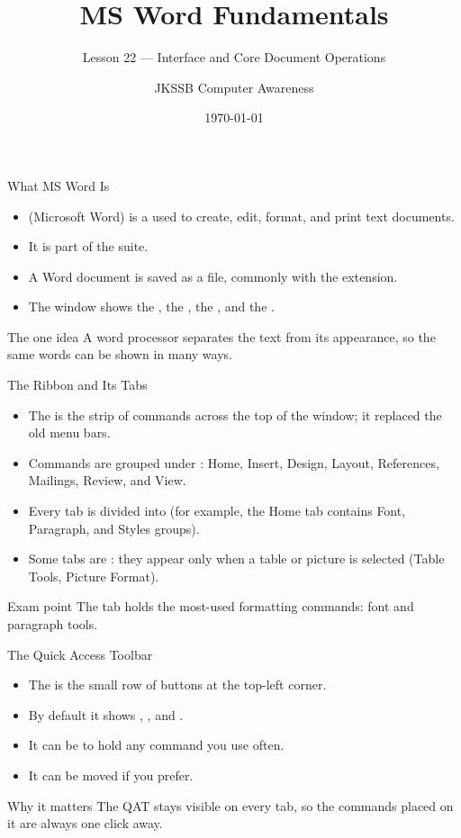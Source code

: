 \documentclass[aspectratio=169]{beamer}
\title{MS Word Fundamentals}
\subtitle{Lesson 22 --- Interface and Core Document Operations}
\author{JKSSB Computer Awareness}
\date{\today}
\begin{document}
\frame{\titlepage}

\begin{frame}{What MS Word Is}
  \begin{itemize}
    \item {} (Microsoft Word) is a  used to
      create, edit, format, and print text documents.
    \item It is part of the  suite.
    \item A Word document is saved as a file, commonly with the
       extension.
    \item The window shows the , the , the
      , and the .
  \end{itemize}
  \begin{block}{The one idea}
    A word processor separates  the text from 
    its appearance, so the same words can be shown in many ways.
  \end{block}
\end{frame}

\begin{frame}{The Ribbon and Its Tabs}
  \begin{itemize}
    \item The  is the strip of commands across the top of the
      window; it replaced the old menu bars.
    \item Commands are grouped under : Home, Insert, Design,
      Layout, References, Mailings, Review, and View.
    \item Every tab is divided into  (for example, the Home tab
      contains Font, Paragraph, and Styles groups).
    \item Some tabs are : they appear only when a table or
      picture is selected (Table Tools, Picture Format).
  \end{itemize}
  \begin{alertblock}{Exam point}
    The  tab holds the most-used formatting commands: font and
    paragraph tools.
  \end{alertblock}
\end{frame}

\begin{frame}{The Quick Access Toolbar}
  \begin{itemize}
    \item The  is the small row of buttons at
      the top-left corner.
    \item By default it shows , , and .
    \item It can be  to hold any command you use often.
    \item It can be moved  if you prefer.
  \end{itemize}
  \begin{block}{Why it matters}
    The QAT stays visible on every tab, so the commands placed on it are
    always one click away.
  \end{block}
\end{frame}
\end{document}
